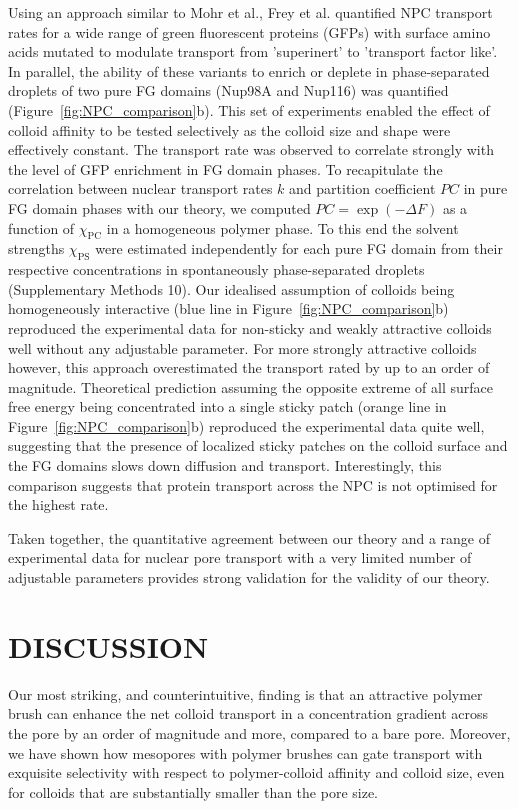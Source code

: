 \documentclass[12pt, a4paper]{article}
\begin{document}
Using an approach similar to Mohr et al., Frey et al. quantified NPC transport rates for a wide range of green fluorescent proteins (GFPs) with surface amino acids mutated to modulate transport from 'superinert' to 'transport factor like'.
In parallel, the ability of these variants to enrich or deplete in phase-separated droplets of two pure FG domains (Nup98A and Nup116) was quantified (Figure~\ref{fig:NPC_comparison}b).
This set of experiments enabled the effect of colloid affinity to be tested selectively as the colloid size and shape were effectively constant.
The transport rate was observed to correlate strongly with the level of GFP enrichment in FG domain phases.
To recapitulate the correlation between nuclear transport rates $k$ and partition coefficient $PC$ in pure FG domain phases with our theory, we computed $PC = \exp(-\Delta F)$ as a function of $\chi_\text{PC}$ in a homogeneous polymer phase.
To this end the solvent strengths $\chi_\text{PS}$ were estimated independently for each pure FG domain from their respective concentrations in spontaneously phase-separated droplets (Supplementary Methods 10).
Our idealised assumption of colloids being homogeneously interactive (blue line in Figure~\ref{fig:NPC_comparison}b) reproduced the experimental data for non-sticky and weakly attractive colloids well without any adjustable parameter.
For more strongly attractive colloids however, this approach overestimated the transport rated by up to an order of magnitude.
Theoretical prediction assuming the opposite extreme of all surface free energy being concentrated into a single sticky patch (orange line in Figure~\ref{fig:NPC_comparison}b) reproduced the experimental data quite well, suggesting that the presence of localized sticky patches on the colloid surface and the FG domains slows down diffusion and transport.
Interestingly, this comparison suggests that protein transport across the NPC is not optimised for the highest rate.

Taken together, the quantitative agreement between our theory and a range of experimental data for nuclear pore transport with a very limited number of adjustable parameters provides strong validation for the validity of our theory.


\section{DISCUSSION}

Our most striking, and counterintuitive, finding is that an attractive polymer brush can enhance the net colloid transport in a concentration gradient across the pore by an order of magnitude and more, compared to a bare pore.
Moreover, we have shown how mesopores with polymer brushes can gate transport with exquisite selectivity with respect to polymer-colloid affinity and colloid size, even for colloids that are substantially smaller than the pore size.
\end{document}
